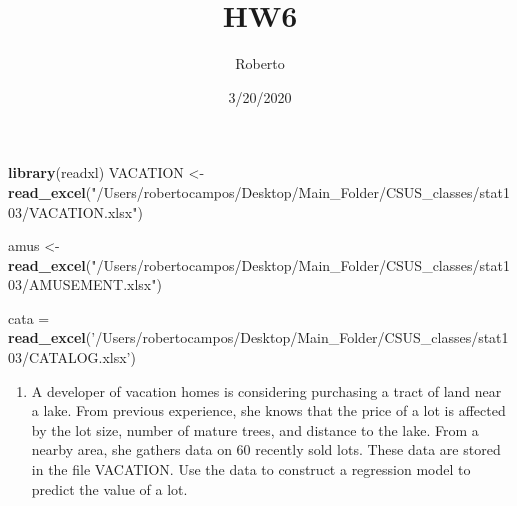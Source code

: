 \documentclass[]{article}
\title{HW6}
\author{Roberto}
\date{3/20/2020}
\newenvironment{Shaded}{\begin{snugshade}}{\end{snugshade}}
\newcommand{\KeywordTok}[1]{\textcolor[rgb]{0.13,0.29,0.53}{\textbf{#1}}}
\newcommand{\NormalTok}[1]{#1}
\newcommand{\StringTok}[1]{\textcolor[rgb]{0.31,0.60,0.02}{#1}}
\providecommand{\tightlist}{%
  \setlength{\itemsep}{0pt}\setlength{\parskip}{0pt}}
\begin{document}
\maketitle

\begin{Shaded}
\begin{Highlighting}[]
\KeywordTok{library}\NormalTok{(readxl)}
\NormalTok{VACATION <-}\StringTok{ }\KeywordTok{read_excel}\NormalTok{(}\StringTok{"/Users/robertocampos/Desktop/Main_Folder/CSUS_classes/stat103/VACATION.xlsx"}\NormalTok{)}

\NormalTok{amus <-}\StringTok{ }\KeywordTok{read_excel}\NormalTok{(}\StringTok{"/Users/robertocampos/Desktop/Main_Folder/CSUS_classes/stat103/AMUSEMENT.xlsx"}\NormalTok{)}

\NormalTok{cata =}\StringTok{  }\KeywordTok{read_excel}\NormalTok{(}\StringTok{'/Users/robertocampos/Desktop/Main_Folder/CSUS_classes/stat103/CATALOG.xlsx'}\NormalTok{)}
\end{Highlighting}
\end{Shaded}

\begin{enumerate}
\def\labelenumi{\arabic{enumi}.}
\tightlist
\item
  A developer of vacation homes is considering purchasing a tract of
  land near a lake. From previous experience, she knows that the price
  of a lot is affected by the lot size, number of mature trees, and
  distance to the lake. From a nearby area, she gathers data on 60
  recently sold lots. These data are stored in the file VACATION. Use
  the data to construct a regression model to predict the value of a
  lot.
\end{enumerate}
\end{document}
